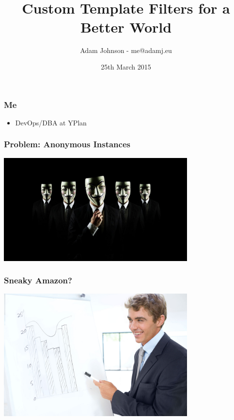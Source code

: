 \documentclass{beamer}
\title{Custom Template Filters for a Better World}
\author{Adam Johnson - me@adamj.eu}
\date{25th March 2015}
\begin{document}
\maketitle


\begin{frame}\frametitle{Me}

    \begin{itemize}
        \item DevOps/DBA at YPlan
    \end{itemize}

\end{frame}


\begin{frame}\frametitle{Problem: Anonymous Instances}

    \begin{center}
        \includegraphics[width=10cm]{anonymous}
    \end{center}

\end{frame}


\begin{frame}\frametitle{Sneaky Amazon?}

    \begin{center}
        \includegraphics[width=10cm]{look-i-made-a-graph}
    \end{center}

\end{frame}
\end{document}
